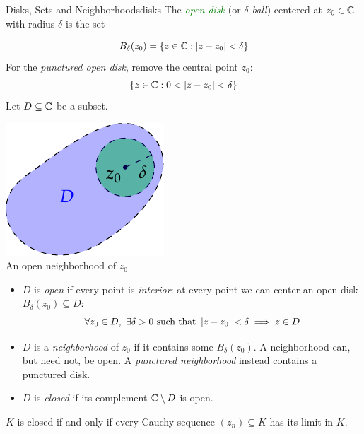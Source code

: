 \begin{defn}{Disks, Sets and Neighborhoods}{disks}
	The \emph{\textcolor{Green}{open disk}} (or \emph{$\delta$-ball}) centered at $z_0\in\mathbb{C}$ with radius $\delta$ is the set\par
	\begin{minipage}[t]{0.65\linewidth}\vspace{-12pt}
		\[
			B_\delta(z_0)=\{z\in\mathbb{C}:\left| z-z_0\right|<\delta\}
		\]
		For the \emph{punctured open disk}, remove the central point $z_0$:
		\[
			\{z\in\mathbb{C}:0<\left| z-z_0\right|<\delta\}
		\]
		Let $D\subseteq \mathbb{C}$ be a subset.
	\end{minipage}
	\hfill
	\begin{minipage}[t]{0.3\linewidth}\vspace{-16pt}
		\centering\includegraphics{functions-open}\\
		An open neighborhood of $z_0$
	\end{minipage}
	\par\vspace{-5pt}
	\begin{itemize}\itemsep2pt
		\item $D$ is \emph{open} if every point is \emph{interior}: at every point we can center an open disk $B_\delta(z_0)\subseteq D$:
		\[
			\forall z_0\in D, \ \exists \delta>0\text{ such that } \left| z-z_0\right|<\delta\implies z\in D
		\]
		\item $D$ is a \emph{neighborhood} of $z_0$ if it contains some $B_\delta(z_0)$. A neighborhood can, but need not, be open. A \emph{punctured neighborhood} instead contains a punctured disk.
		\item $D$ is \emph{closed} if its complement $\mathbb{C}\setminus D$ is open.
	\end{itemize}
\end{defn}

\begin{thm}{}{}
	$K$ is closed if and only if every Cauchy sequence $(z_n)\subseteq K$ has its limit in $K$.
\end{thm}


